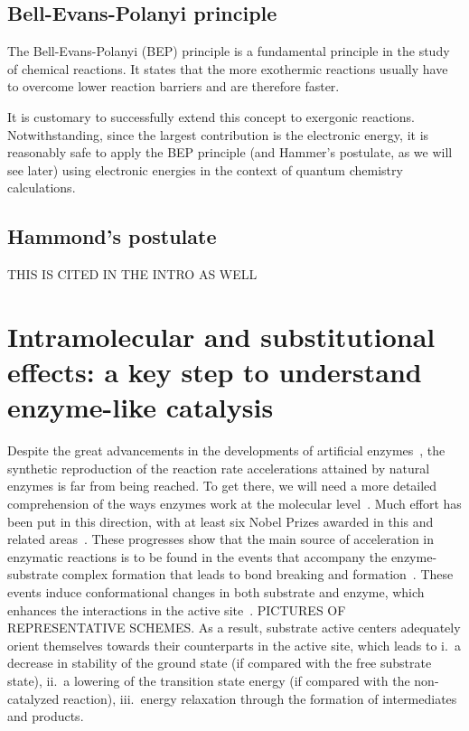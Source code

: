 \subsection{Bell-Evans-Polanyi principle}

The Bell-Evans-Polanyi (BEP) principle is a fundamental principle in the study
of chemical reactions.
It states that the more exothermic reactions usually have to overcome lower
reaction barriers and are therefore faster.


It is customary to successfully extend this concept to exergonic reactions.
Notwithstanding,
since the largest contribution is the electronic energy,
it is reasonably
safe to apply the BEP principle (and Hammer's postulate,
as we will see later)
using electronic energies in the context of quantum chemistry calculations.

\subsection{Hammond's postulate}

THIS IS CITED IN THE INTRO AS WELL

\section{Intramolecular and substitutional effects:
  a key step to understand enzyme-like catalysis}

Despite the great advancements in the developments of artificial enzymes~\cite{Breslow_1995},
the synthetic reproduction of the reaction rate accelerations attained by
natural enzymes is far from being reached.
To get there,
we will need a more detailed comprehension of the ways enzymes
work at the molecular level~\cite{Catalysis_in_Chemistry_and_Enzymology}.
Much effort has been put in this direction,
with at least six Nobel Prizes
awarded in this and related areas~\cite{Nobel_1929,Nobel_1946,Nobel_1957,Nobel_1975,Nobel_1997,Nobel_2013}.
These progresses show that the main source of acceleration in
enzymatic reactions is to be found in the events that accompany the
enzyme-substrate complex formation that leads to bond breaking and
formation~\cite{Catalysis_in_Chemistry_and_Enzymology}.
These events induce conformational changes in both substrate and enzyme,
which
enhances the interactions in the active site~\cite{Fischer_1890,Fischer_1894,Koshland_1958,Dafforn_1971,Kirby_1996}.
PICTURES OF REPRESENTATIVE SCHEMES.\@
As a result,
substrate active centers adequately orient themselves towards
their counterparts in the active site,
which leads to
i.\ a decrease in stability of the ground state (if compared with the
free substrate state),
ii.\ a lowering of the transition state energy (if compared with the
non-catalyzed reaction),
iii.\ energy relaxation through the formation of intermediates and
products.


